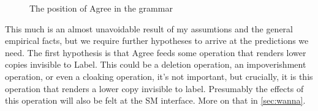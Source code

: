 \documentclass[MilwayThesis]{subfiles}
\begin{document}
%
%
\begin{figure}[h]
  \centering
  \caption{The position of Agree in the grammar}
  \label{fig:SepCycles}
\end{figure}

This much is an almost unavoidable result of my assumtions and the general empirical facts, but we require further hypotheses to arrive at the predictions we need.
The first hypothesis is that Agree feeds some operation that renders lower copies invisible to Label.
This could be a deletion operation, an impoverishment operation, or even a cloaking operation, it's not important, but crucially, it is this operation that renders a lower copy invisible to label.
Presumably the effects of this operation will also be felt at the SM interface.
More on that in \cref{sec:wanna}.
\end{document}
